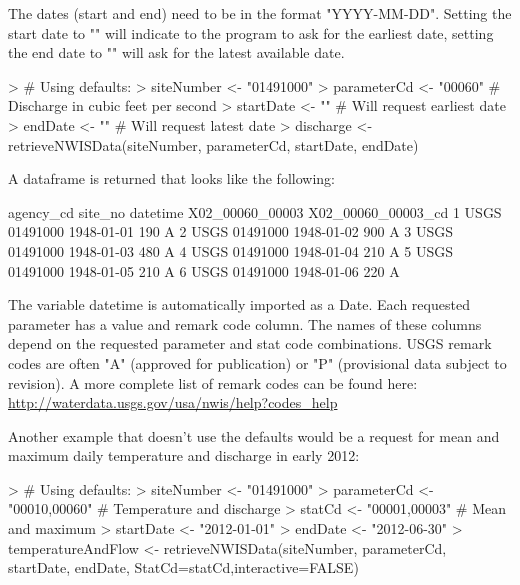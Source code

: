 \documentclass[a4paper,11pt]{article}
\begin{document}
The dates (start and end) need to be in the format "YYYY-MM-DD".  Setting the start date to "" will indicate to the program to ask for the earliest date, setting the end date to "" will ask for the latest available date.

\begin{Schunk}
\begin{Sinput}
> # Using defaults:
> siteNumber <- "01491000"
> parameterCd <- "00060"  # Discharge in cubic feet per second
> startDate <- ""  # Will request earliest date
> endDate <- "" # Will request latest date
> discharge <- retrieveNWISData(siteNumber, parameterCd, startDate, endDate)
\end{Sinput}
\end{Schunk}

A dataframe is returned that looks like the following:
\begin{Schunk}
\begin{Soutput}
  agency_cd  site_no   datetime X02_00060_00003 X02_00060_00003_cd
1      USGS 01491000 1948-01-01             190                  A
2      USGS 01491000 1948-01-02             900                  A
3      USGS 01491000 1948-01-03             480                  A
4      USGS 01491000 1948-01-04             210                  A
5      USGS 01491000 1948-01-05             210                  A
6      USGS 01491000 1948-01-06             220                  A
\end{Soutput}
\end{Schunk}

The variable datetime is automatically imported as a Date. Each requested parameter has a value and remark code column.  The names of these columns depend on the requested parameter and stat code combinations. USGS remark codes are often "A" (approved for publication) or "P" (provisional data subject to revision). A more complete list of remark codes can be found here:
\url{http://waterdata.usgs.gov/usa/nwis/help?codes_help}

Another example that doesn't use the defaults would be a request for mean and maximum daily temperature and discharge in early 2012:
\begin{Schunk}
\begin{Sinput}
> # Using defaults:
> siteNumber <- "01491000" 
> parameterCd <- "00010,00060"  # Temperature and discharge
> statCd <- "00001,00003"  # Mean and maximum
> startDate <- "2012-01-01"
> endDate <- "2012-06-30"
> temperatureAndFlow <- retrieveNWISData(siteNumber, parameterCd, 
                   startDate, endDate, StatCd=statCd,interactive=FALSE)
\end{Sinput}
\end{Schunk}
\end{document}
